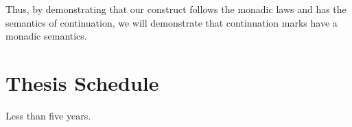 \documentclass[ms]{byuprop}
\begin{document}
Thus, by demonstrating that our construct follows the monadic laws and has the semantics
of continuation, we will demonstrate that continuation marks have a monadic semantics.







\section{Thesis Schedule}

Less than five years.





\end{document}
